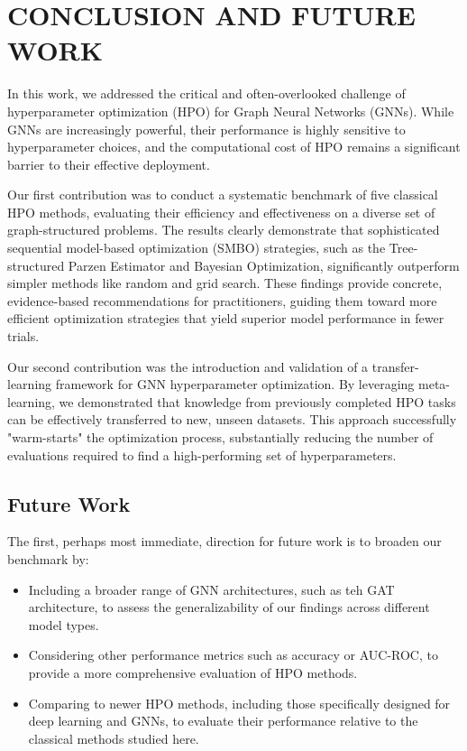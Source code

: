 \section{\uppercase{Conclusion and Future work}}
\label{sec:conclusion}

In this work, we addressed the critical and often-overlooked challenge of hyperparameter optimization (HPO) for Graph Neural Networks (GNNs). While GNNs are increasingly powerful, their performance is highly sensitive to hyperparameter choices, and the computational cost of HPO remains a significant barrier to their effective deployment.

Our first contribution was to conduct a systematic benchmark of five classical HPO methods, evaluating their efficiency and effectiveness on a diverse set of graph-structured problems. The results clearly demonstrate that sophisticated sequential model-based optimization (SMBO) strategies, such as the Tree-structured Parzen Estimator and Bayesian Optimization, significantly outperform simpler methods like random and grid search. These findings provide concrete, evidence-based recommendations for practitioners, guiding them toward more efficient optimization strategies that yield superior model performance in fewer trials.

Our second contribution was the introduction and validation of a transfer-learning framework for GNN hyperparameter optimization. By leveraging meta-learning, we demonstrated that knowledge from previously completed HPO tasks can be effectively transferred to new, unseen datasets. This approach successfully "warm-starts" the optimization process, substantially reducing the number of evaluations required to find a high-performing set of hyperparameters.

\subsection{Future Work}

The first, perhaps most immediate, direction for future work is to broaden our benchmark by:
\begin{itemize}
	\item Including a broader range of GNN architectures, such as teh GAT architecture, to assess the generalizability of our findings across different model types.
	\item Considering other performance metrics such as accuracy or AUC-ROC, to provide a more comprehensive evaluation of HPO methods.
	\item Comparing to newer HPO methods, including those specifically designed for deep learning and GNNs, to evaluate their performance relative to the classical methods studied here.
\end{itemize}

